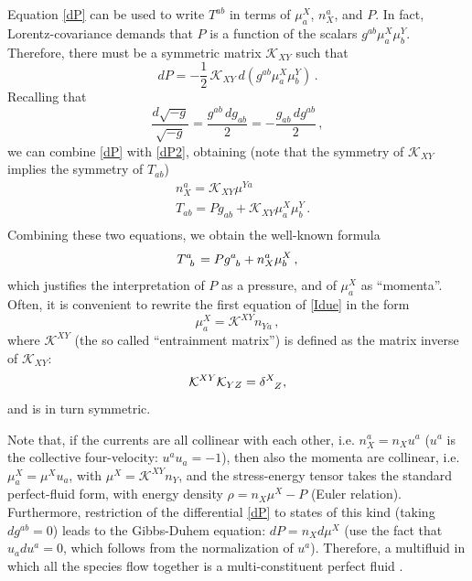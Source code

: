 \documentclass[a4paper, amsfonts, amssymb, amsmath, reprint, showkeys, nofootinbib, twoside, onecolumn,notitlepage]{revtex4-1}
\theoremstyle{definition}
\theoremstyle{theorem}
\begin{document}
Equation \eqref{dP} can be used to write $T^{ab}$ in terms of $\mu^X_a$, $n_X^a$, and $P$. In fact, Lorentz-covariance demands that $P$ is a function of the scalars $g^{ab}\mu^X_a \mu^Y_b$. Therefore, there must be a symmetric matrix $\mathcal{K}_{XY}$ such that
\begin{equation}\label{dP2}
dP= -\dfrac{1}{2} \, \mathcal{K}_{XY} \, d(g^{ab}\mu^X_a \mu^Y_b) \, .
\end{equation}
Recalling that \cite{MTW_book}
\begin{equation}
\dfrac{d\sqrt{-g}}{\sqrt{-g}} = \dfrac{g^{ab} \, dg_{ab}}{2} = -\dfrac{g_{ab} \, dg^{ab}}{2} \, ,
\end{equation}
we can combine \eqref{dP} with \eqref{dP2}, obtaining (note that the symmetry of $\mathcal{K}_{XY}$ implies the symmetry of $T_{ab}$)
\begin{equation}\label{Idue}
\begin{split}
& n_X^a = \mathcal{K}_{XY} \mu^{Ya} \\
& T_{ab} = P g_{ab} + \mathcal{K}_{XY} \mu^{X}_a \mu^Y_b \, . \\
\end{split}
\end{equation}
Combining these two equations, we obtain the well-known formula
\begin{equation}\label{Tabcanonico}
T\indices{^a _b} = P g\indices{^a _b} + n_X^a \mu^X_b \, ,
\end{equation}
which justifies the interpretation of $P$ as a pressure, and of $\mu^X_a$ as ``momenta''. Often, it is convenient to rewrite the first equation of \eqref{Idue} in the form
\begin{equation}\label{entrainment}
\mu^X_a = \mathcal{K}^{XY}n_{Ya} \, ,
\end{equation}
where $\mathcal{K}^{XY}$ (the so called ``entrainment matrix'') is defined as the matrix inverse of $\mathcal{K}_{XY}$:
\begin{equation}
\mathcal{K}^{XY} \mathcal{K}_{YZ} = \delta\indices{^X _Z},
\end{equation}
and is in turn symmetric.

Note that, if the currents are all collinear with each other, i.e. $n_X^a=n_X u^a$ ($u^a$ is the collective four-velocity: $u^a u_a =-1$), then also the momenta are collinear, i.e. $\mu^X_a = \mu^X u_a$, with $\mu^X = \mathcal{K}^{XY}n_Y$, and the stress-energy tensor takes the standard perfect-fluid form, with energy density $\rho=n_X \mu^X-P$ (Euler relation). Furthermore, restriction of the differential \eqref{dP} to states of this kind (taking $dg^{ab}=0$) leads to the Gibbs-Duhem equation: $dP=n_X d\mu^X$ (use the fact that $u_a du^a=0$, which follows from the normalization of $u^a$). Therefore, a multifluid in which all the species flow together is a multi-constituent perfect fluid \cite{Termo}. 
\end{document}
